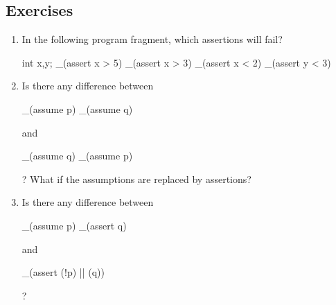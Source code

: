 \subsection*{Exercises}
\begin{enumerate}
\item
In the following program fragment, which assertions will fail?
\begin{VCC}
int x,y; 
_(assert x > 5) 
_(assert x > 3) 
_(assert x < 2) 
_(assert y < 3)
\end{VCC}
\item
Is there any difference between 
\begin{VCC}
_(assume p)
_(assume q)
\end{VCC}
and 
\begin{VCC}
_(assume q) 
_(assume p)
\end{VCC}
? What if the assumptions are replaced by assertions?
\item
Is there any difference between
\begin{VCC}
_(assume p)
_(assert q)
\end{VCC}
and 
\begin{VCC}
_(assert (!p) || (q))
\end{VCC}
? 

\end{enumerate}

